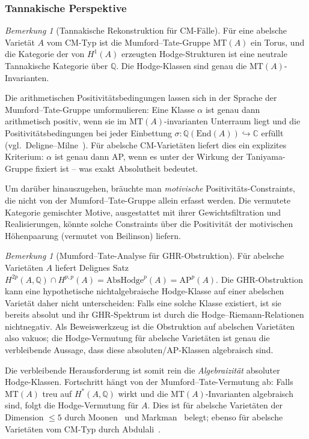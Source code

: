 \documentclass[aps,prd,twocolumn,superscriptaddress,nofootinbib]{revtex4-2}
\theoremstyle{definition}
\theoremstyle{remark}
\newtheorem{remark}[theorem]{Bemerkung}
\begin{document}
\subsubsection{Tannakische Perspektive}

\begin{remark}[Tannakische Rekonstruktion für CM-Fälle]
\label{rem:tannakian}
Für eine abelsche Varietät $A$ vom CM-Typ ist die Mumford--Tate-Gruppe $\mathrm{MT}(A)$ ein Torus, und die Kategorie der von $H^1(A)$ erzeugten Hodge-Strukturen ist eine neutrale Tannakische Kategorie über $\mathbb{Q}$. Die Hodge-Klassen sind genau die $\mathrm{MT}(A)$-Invarianten.

Die arithmetischen Positivitätsbedingungen lassen sich in der Sprache der Mumford--Tate-Gruppe umformulieren: Eine Klasse $\alpha$ ist genau dann arithmetisch positiv, wenn sie im $\mathrm{MT}(A)$-invarianten Unterraum liegt und die Positivitätsbedingungen bei jeder Einbettung $\sigma: \mathbb{Q}(\mathrm{End}(A)) \hookrightarrow \mathbb{C}$ erfüllt (vgl.\ Deligne--Milne~\cite{DeligneMilne1982}). Für abelsche CM-Varietäten liefert dies ein explizites Kriterium: $\alpha$ ist genau dann AP, wenn es unter der Wirkung der Taniyama-Gruppe fixiert ist -- was exakt Absolutheit bedeutet.

Um darüber hinauszugehen, bräuchte man \textit{motivische} Positivitäts-Constraints, die nicht von der Mumford--Tate-Gruppe allein erfasst werden. Die vermutete Kategorie gemischter Motive, ausgestattet mit ihrer Gewichtsfiltration und Realisierungen, könnte solche Constraints über die Positivität der motivischen Höhenpaarung (vermutet von Beilinson) liefern.
\end{remark}

\begin{remark}[Mumford--Tate-Analyse für GHR-Obstruktion]
\label{rem:mumford-tate-ghr}
Für abelsche Varietäten $A$ liefert Delignes Satz
$H^{2p}(A,\mathbb{Q})\cap H^{p,p}(A)=\mathrm{AbsHodge}^p(A)=\mathrm{AP}^p(A)$.
Die GHR-Obstruktion kann eine hypothetische nichtalgebraische Hodge-Klasse auf einer abelschen Varietät daher nicht unterscheiden: Falls eine solche Klasse existiert, ist sie bereits absolut und ihr GHR-Spektrum ist durch die Hodge--Riemann-Relationen nichtnegativ. Als Beweiswerkzeug ist die Obstruktion auf abelschen Varietäten also vakuos; die Hodge-Vermutung für abelsche Varietäten ist genau die verbleibende Aussage, dass diese absoluten/AP-Klassen algebraisch sind.

Die verbleibende Herausforderung ist somit rein die \textit{Algebraizität} absoluter Hodge-Klassen. Fortschritt hängt von der Mumford--Tate-Vermutung ab: Falls $\mathrm{MT}(A)$ treu auf $H^*(A, \mathbb{Q})$ wirkt und die $\mathrm{MT}(A)$-Invarianten algebraisch sind, folgt die Hodge-Vermutung für $A$. Dies ist für abelsche Varietäten der Dimension $\leq 5$ durch Moonen~\cite{Moonen1999} und Markman~\cite{Markman2025} belegt; ebenso für abelsche Varietäten vom CM-Typ durch Abdulali~\cite{Abdulali1994}.
\end{remark}
\end{document}
